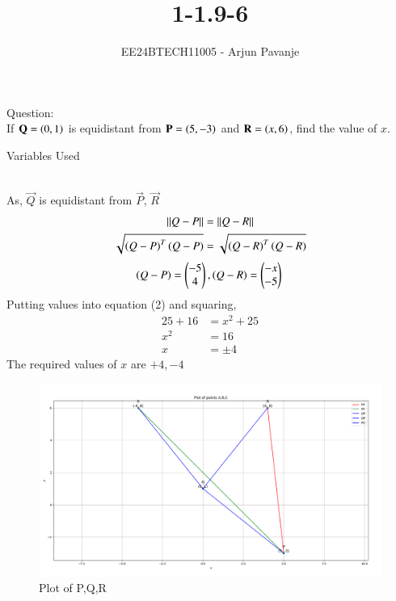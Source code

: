 \documentclass[journal]{IEEEtran}
\begin{document}

\vspace{3cm}

\title{1-1.9-6}
\author{EE24BTECH11005 - Arjun Pavanje
}
{\let\newpage\relax\maketitle}
Question:\\
If $\mathbf{Q}=\left(0,1\right)$ is equidistant from $\mathbf{P}=\left(5,-3\right)$ and $\mathbf{R}=\left(x,6\right)$, find the value of $x$.\\
\solution
\begin{table}[h!]    
  \centering
  
  \caption{Variables Used}
  \label{tab1-1.9-6}
\end{table}\\
As, $\vec{Q}$ is equidistant from $\vec{P}$, $\vec{R}$\\
\begin{align}
	\left\lVert Q-P\right\rVert &= \left\lVert Q-R\right\rVert\\
		\sqrt{\left(Q-P\right)^T\left(Q-P\right)}&=\sqrt{\left(Q-R\right)^T\left(Q-R\right)}
\end{align}
$$		\left(Q-P\right) = \begin{pmatrix}
			-5\\
			4
		\end{pmatrix},
		\left(Q-R\right)=\begin{pmatrix}
			-x\\
			-5
		\end{pmatrix}\\
$$
Putting values into equation (2) and squaring,
\begin{align}
	25+16&=x^2+25\\
	x^2&=16\\
	x &= \pm{4}
\end{align}
The required values of $x$ are $+4,-4$
\begin{figure}[h!]
   \centering
   \includegraphics[width = 1\linewidth]{figs/Figure_1.png}
   \caption{Plot of P,Q,R}
   \label{stemplot}
\end{figure}
\end{document}
